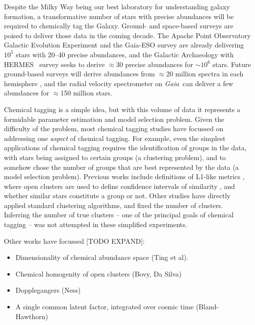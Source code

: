\documentclass{aastex61}
\newcommand{\acronym}[1]{{\small{#1}}}
\newcommand{\project}[1]{\textsl{#1}}
\newcommand{\apogee}{\acronym{APOGEE}}
\newcommand{\ges}{\acronym{GES}}
\newcommand{\hermes}{\acronym{HERMES}}
\newcommand{\galah}{\acronym{GALAH}}
\newcommand{\fourmost}{\acronym{4MOST}}
\newcommand{\weave}{\acronym{WEAVE}}
\newcommand{\gaia}{\project{Gaia}}
\begin{document}

Despite the Milky Way being our best laboratory for understanding galaxy
formation, a transformative number of stars with precise abundances will be
required to chemically tag the Galaxy.
Ground- and space-based surveys are poised to deliver those data in the coming
decade. 
The Apache Point Observatory Galactic Evolution Experiment 
\citep[\apogee, e.g.,][]{apogee} and the Gaia-ESO survey 
\citep[\ges;][]{Gilmore_2012,Randich_2013} are already delivering $10^5$ stars 
with 20--40 precise abundances, and the Galactic Archaeology with \hermes\ 
\citep[\galah;][]{DeSilva_2015} survey seeks to derive $\approx$30 precise 
abundances for $\sim10^6$ stars. 
Future ground-based surveys will derive abundances from $\approx$20 million 
spectra in each hemisphere \citep[e.g., \weave, \fourmost;][]{weave,4most},
and the radial velocity spectrometer on \gaia\ can deliver a few abundances 
for $\approx$150 million stars.


Chemical tagging is a simple idea, but with this volume of data it represents
a formidable parameter estimation and model selection problem.
Given the difficulty of the problem, most chemical tagging studies have 
focussed on addressing one \emph{aspect} of chemical tagging.
For example, even the simplest applications of chemical tagging requires the
identification of groups in the data, with stars being assigned to certain
groups (a clustering problem), and to somehow chose the number of groups that
are best represented by the data (a model selection problem).
Previous works include definitions of L1-like metrics \citep{Mitschang_2014},
where open clusters are used to define confidence intervals of similarity
\citep{Mitschang_2013}, and whether similar stars constitute a group or not.
Other studies have directly applied standard clustering algorithms,
\citep[e.g., \acronym{DBSCAN}, $k$-means;][]{Blanco_Cuaresma_2015,Hogg_2016} 
and fixed the number of clusters.
Inferring the number of true clusters -- one of the principal goals of 
chemical tagging -- was not attempted in these simplified experiments.


Other works have focussed [TODO EXPAND]:
\begin{itemize}
  \item Dimensionality of chemical abundance space (Ting et al).
  \item Chemical homogenity of open clusters (Bovy, Da Silva)
  \item Dopplegangers (Ness)
  \item A single common latent factor, integrated over cosmic time (Bland-Hawthorn)
\end{itemize}
\end{document}
